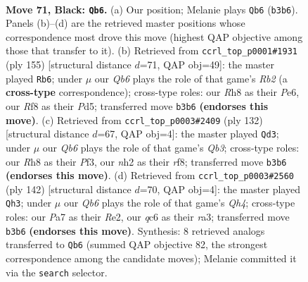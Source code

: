 \documentclass[11pt]{article}
\begin{document}
\clearpage

\begin{figure}[p]\centering
\begin{subfigure}{0.46\textwidth}\centering
\resizebox{\linewidth}{!}{%
\newchessgame
\chessboard[
  setfen={5r1r/p5p1/k1Q4p/3p3P/p2P2P1/1q2P3/7N/4b2K b - - 51 71},
  showmover=false,
  pgfstyle=straightmove, color=movearrow, markmove={b3-b6}
]}
\caption{}
\end{subfigure}\hfill
\begin{subfigure}{0.46\textwidth}\centering
\resizebox{\linewidth}{!}{%
\newchessgame
\chessboard[
  setfen={8/1r3p2/k2Qp1p1/p2pP3/P4P2/4P2K/4b3/8 b - - 30 78},
  showmover=false,
  pgfstyle=straightmove, color=movearrow, markmove={b7-b6}
]}
\caption{}
\end{subfigure}
\\[4pt]
\begin{subfigure}{0.46\textwidth}\centering
\resizebox{\linewidth}{!}{%
\newchessgame
\chessboard[
  setfen={5r2/7k/1pP1p1pP/1P2p3/3pP3/RQ3P2/4q3/1K6 w - - 6 67},
  showmover=false,
  pgfstyle=straightmove, color=movearrow, markmove={b3-d3}
]}
\caption{}
\end{subfigure}\hfill
\begin{subfigure}{0.46\textwidth}\centering
\resizebox{\linewidth}{!}{%
\newchessgame
\chessboard[
  setfen={7k/6p1/2p1p2p/p3Pq1P/5P1Q/r5B1/4R1K1/8 w - - 2 72},
  showmover=false,
  pgfstyle=straightmove, color=movearrow, markmove={h4-h3}
]}
\caption{}
\end{subfigure}
\caption{\textbf{Move 71, Black: \texttt{Qb6}.} (a) Our position; Melanie plays \texttt{Qb6} (\texttt{b3b6}). Panels (b)--(d) are the retrieved master positions whose correspondence most drove this move (highest QAP objective among those that transfer to it). (b) Retrieved from \texttt{ccrl\_top\_p0001\#1931} (ply 155) [structural distance $d$=71, QAP obj=49]: the master played \texttt{Rb6}; under $\mu$ our \emph{Qb6} plays the role of that game's \emph{Rb2} (a \textbf{cross-type} correspondence); cross-type roles: our \emph{R}h8 as their \emph{P}e6, our \emph{R}f8 as their \emph{P}d5; transferred move \texttt{b3b6} \textbf{(endorses this move)}. (c) Retrieved from \texttt{ccrl\_top\_p0003\#2409} (ply 132) [structural distance $d$=67, QAP obj=4]: the master played \texttt{Qd3}; under $\mu$ our \emph{Qb6} plays the role of that game's \emph{Qb3}; cross-type roles: our \emph{R}h8 as their \emph{P}f3, our \emph{n}h2 as their \emph{r}f8; transferred move \texttt{b3b6} \textbf{(endorses this move)}. (d) Retrieved from \texttt{ccrl\_top\_p0003\#2560} (ply 142) [structural distance $d$=70, QAP obj=4]: the master played \texttt{Qh3}; under $\mu$ our \emph{Qb6} plays the role of that game's \emph{Qh4}; cross-type roles: our \emph{P}a7 as their \emph{R}e2, our \emph{q}c6 as their \emph{r}a3; transferred move \texttt{b3b6} \textbf{(endorses this move)}. Synthesis: 8 retrieved analogs transferred to \texttt{Qb6} (summed QAP objective 82, the strongest correspondence among the candidate moves); Melanie committed it via the \texttt{search} selector.}
\label{fig:thought-m141}
\end{figure}
\end{document}
